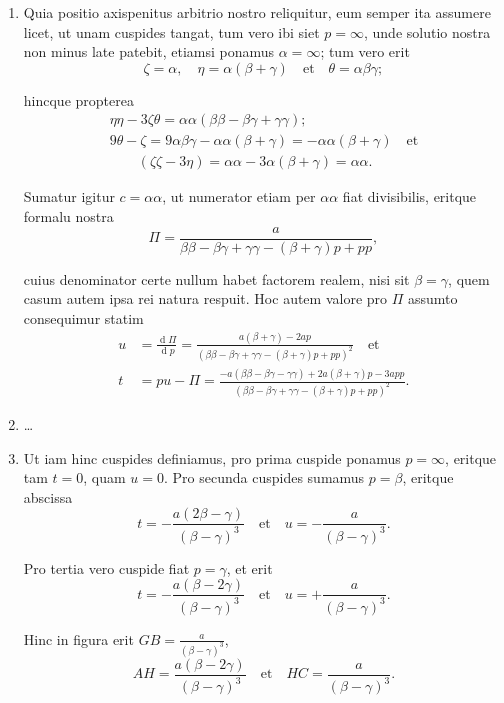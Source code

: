 \documentclass[10pt,a4paper]{article}
\newcommand{\switchenum}{\setcounter{enumi}{\arabic{enumi}-1}\switchcolumn}
\begin{document}
\begin{paracol}{2}
\begin{enumerate}[topsep=1px]
		\item Quia positio axispenitus arbitrio nostro reliquitur, eum semper ita assumere licet, ut unam cuspides tangat, tum vero ibi siet $p=\infty$, unde solutio nostra non minus late patebit, etiamsi ponamus $\alpha = \infty$; tum vero erit
		\[
			\zeta = \alpha, \quad \eta = \alpha(\beta+ \gamma)\quad \text{et}\quad  \theta = \alpha \beta \gamma;
		\]
		\par hincque propterea
		\begin{align*}
			\eta \eta - 3\zeta \theta = \alpha \alpha (\beta \beta - \beta \gamma + \gamma \gamma);\\
			9\theta - \zeta = 9\alpha \beta \gamma - \alpha \alpha(\beta + \gamma) = - \alpha \alpha (\beta + \gamma)\quad \text{et}\\
			\qquad (\zeta \zeta - 3\eta) = \alpha \alpha - 3\alpha (\beta + \gamma) = \alpha \alpha.
		\end{align*}
		\par Sumatur igitur $c= \alpha \alpha$, ut numerator etiam per $\alpha \alpha$ fiat divisibilis, eritque formalu nostra
		\[
			\Pi = \frac{a}{\beta \beta -\beta \gamma+\gamma \gamma -(\beta + \gamma)p + pp},
		\]
		\par cuius denominator certe nullum habet factorem realem, nisi sit $\beta = \gamma$, quem casum autem ipsa rei natura respuit. Hoc autem valore pro $\Pi$ assumto consequimur statim
		\begin{align*}
			u &= \frac{\operatorname{d}\Pi}{\operatorname{d}p} = \frac{a(\beta + \gamma)-2ap}{(\beta \beta -\beta \gamma +\gamma \gamma - (\beta+\gamma)p+pp)^2} \quad \text{et}\\
			t & = pu - \Pi = \frac{-a(\beta \beta - \beta \gamma-\gamma \gamma)+2a(\beta+\gamma)p -3app}{(\beta \beta - \beta \gamma + \gamma \gamma -(\beta + \gamma)p+pp)^2}.
		\end{align*}
		
		\switchenum
		\item \ldots
		\switchcolumn*
		
		\item Ut iam hinc cuspides definiamus, pro prima cuspide ponamus $p = \infty$, eritque tam $t= 0$, quam $u=0$. Pro secunda cuspides sumamus $p=\beta$, eritque abscissa
		\[
			t = -\frac{a(2\beta- \gamma)}{(\beta - \gamma)^3} \quad \text{et} \quad u = - \frac{a}{(\beta-\gamma)^3}.
		\]
		\par Pro tertia vero cuspide fiat $p=\gamma$, et erit
		\[
			t = -\frac{a(\beta - 2\gamma)}{(\beta-\gamma)^3} \quad \text{et}\quad u = +\frac{a}{(\beta-\gamma)^3}.
		\]
		\par Hinc in figura erit $GB = \frac{a}{(\beta - \gamma)^3}$,
		\[
			AH = \frac{a(\beta - 2\gamma)}{(\beta - \gamma)^3} \quad \text{et}\quad HC = \frac{a}{(\beta - \gamma)^3}.
		\]
		

\end{enumerate}
\end{paracol}
\end{document}
